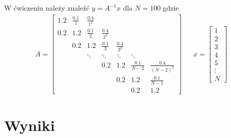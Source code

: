 \documentclass[11pt]{extarticle}
\begin{document}
	\subsection{}
	W ćwiczeniu należy znaleźć \(y = A^{-1}x\) dla \(N=100\) gdzie
	\begin{align}
		A = \begin{bmatrix}
							  1.2		& \frac{0.1}{1}		& \frac{0.4}{1^2} 		\\[6pt]
					0.2		& 1.2		& \frac{0.1}{2}		& \frac{0.4}{2^2} 		\\[6pt]
			&		0.2		& 1.2		& \frac{0.1}{3}		& \frac{0.4}{3^2} 		\\[6pt]
			&&		\ddots	& \ddots	& \ddots			& \ddots 				\\[6pt]
			&&&		0.2		& 1.2		& \frac{0.1}{N-2}	& \frac{0.4}{(N-2)^2} 	\\[6pt]
			&&&&	0.2		& 1.2		& \frac{0.1}{N-1}							\\[6pt]
			&&&&&	0.2		& 1.2
		\end{bmatrix} &&
		x = \begin{bmatrix}
			1 \\[6pt]
			2 \\[6pt]
			3 \\[6pt]
			4 \\[6pt]
			5 \\[6pt]
			\vdots \\[6pt]
			N
		\end{bmatrix}
	\end{align}

	\section{Wyniki}
\end{document}
